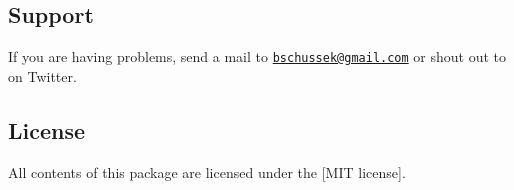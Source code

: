 \subsection*{Support }

If you are having problems, send a mail to \href{mailto:bschussek@gmail.com}{\tt bschussek@gmail.\+com} or shout out to \href{https://twitter.com/webmozart}{\tt } on Twitter.

\subsection*{License }

All contents of this package are licensed under the \mbox{[}M\+IT license\mbox{]}. 